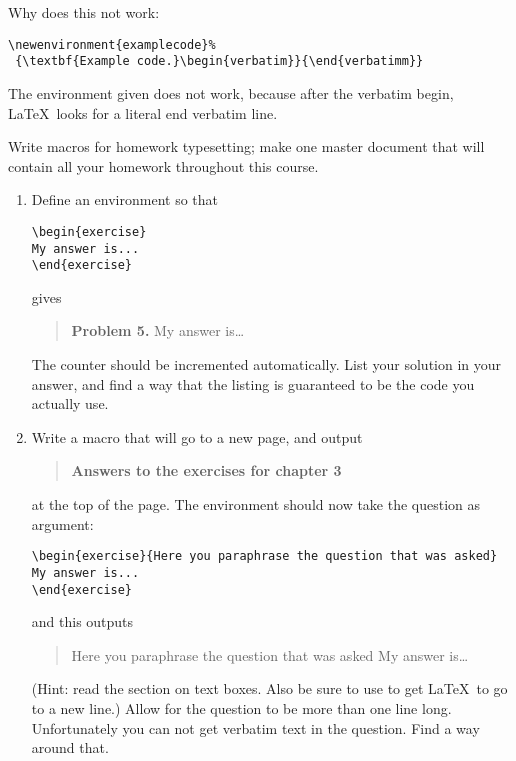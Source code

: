 \begin{594exercise}
  Why does this not work:
\begin{verbatim}
\newenvironment{examplecode}%
 {\textbf{Example code.}\begin{verbatim}}{\end{verbatimm}}
\end{verbatim}
\end{594exercise}
\begin{answer}
The environment given does not work, because after the verbatim begin,
\LaTeX\ looks for a literal end verbatim line.
\end{answer}

\begin{594exercise}
Write macros for homework typesetting; make one master document
  that will contain all your homework throughout this course.
\begin{enumerate}
\item Define an environment  so that
\begin{verbatim}
\begin{exercise}
My answer is...
\end{exercise}
\end{verbatim}
gives
\begin{quote}
\textbf{Problem 5.} My answer is\dots
\end{quote}
The counter should be incremented automatically. List your solution in
your answer, and find a way that the listing is guaranteed to be the
code you actually use.
\item Write a macro  that will go to a new page, and
  output
\begin{quote}
\textbf{Answers to the exercises for chapter 3}
\end{quote}
at the top of the page. The  environment should now take
the question as argument:
\begin{verbatim}
\begin{exercise}{Here you paraphrase the question that was asked}
My answer is...
\end{exercise}
\end{verbatim}
and this outputs
\begin{quote}
\begin{exerciseB}{Here you paraphrase the question that was asked}
My answer is\dots
\end{exerciseB}
\end{quote}
(Hint: read the section on text boxes. Also be sure to use  to
get \LaTeX\ to go to a new line.)
Allow for the question to be more than one line long. Unfortunately
you can not get verbatim text in the question. Find a way around that.
\end{enumerate}
\end{594exercise}
